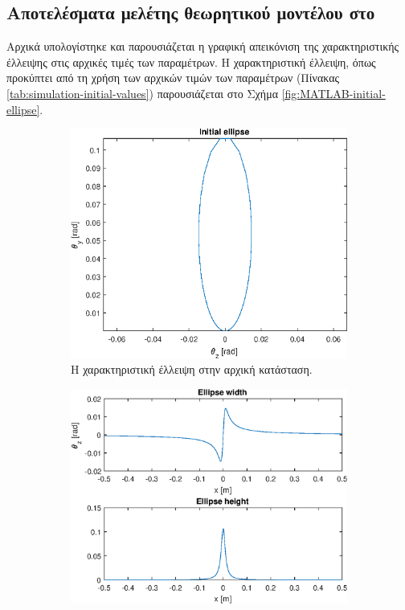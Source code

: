\subsection{Αποτελέσματα μελέτης θεωρητικού μοντέλου στο }

Αρχικά υπολογίστηκε και παρουσιάζεται η γραφική απεικόνιση της χαρακτηριστικής έλλειψης στις αρχικές τιμές των παραμέτρων.
Η χαρακτηριστική έλλειψη, όπως προκύπτει από τη χρήση των αρχικών τιμών των παραμέτρων (Πίνακας \ref{tab:simulation-initial-values}) παρουσιάζεται στο Σχήμα \ref{fig:MATLAB-initial-ellipse}.

\begin{figure}[tph]	
	\begin{subfigure}{0.47\textwidth}
		\includegraphics[width=\linewidth]{figures/MATLAB-variable-analysis/initial-ellipse}
		\centering
		\caption{Η χαρακτηριστική έλλειψη στην αρχική κατάσταση.}
		\label{fig:MATLAB-variable-analysis-initial-ellipse}
	\end{subfigure}
	\hfill
	\begin{subfigure}{0.47\textwidth}
		\includegraphics[width=\linewidth]{figures/MATLAB-variable-analysis/initial-ellipse-height-width}

\end{subfigure}
\end{figure}

